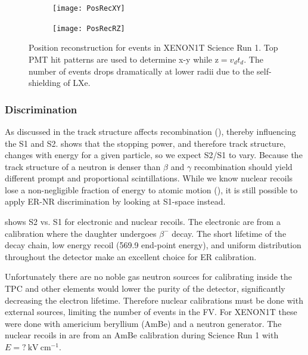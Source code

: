 \begin{figure}
    \centering
    \begin{subfigure}[t]{0.45\textwidth}
        \centering
        \texttt{[image: PosRecXY]}
    \end{subfigure}%
    \begin{subfigure}[t]{0.45\textwidth}
        \centering
        \texttt{[image: PosRecRZ]}
    \end{subfigure}
    \caption{Position reconstruction for events in XENON1T Science Run 1.  Top PMT hit patterns are used to determine x-y while
    $\mathrm{z} = v_{d} t_{d}$.  The number of events drops dramatically at lower radii due to the self-shielding of LXe.}
	\label{fig:tpcs_signals_posrec}
\end{figure}



\subsubsection{Discrimination}
\label{subsubsec:tpcs_signals_discr}
As discussed in  the track structure affects recombination (), thereby
influencing the S1 and S2.   shows that the stopping power, and therefore track structure, changes
with energy for a given particle, so we expect S2/S1 to vary.  Because the track structure of a neutron is denser than $\beta$ and
$\gamma$ recombination should yield different prompt and proportional scintillations.  While we know nuclear recoils lose a
non-negligible fraction of energy to atomic motion
(), it is still possible to apply ER-NR discrimination by looking at S1-space instead.

 shows S2 vs. S1 for electronic and nuclear recoils.  The electronic are from a  calibration
where the  daughter undergoes $\beta^{-}$ decay.  The short lifetime of the  decay chain, low energy
recoil (569.9 end-point energy), and uniform distribution throughout the detector make  an excellent choice for
ER calibration.

Unfortunately there are no noble gas neutron sources
for calibrating inside the TPC and other elements would lower the purity of the detector, significantly decreasing the electron
lifetime.  Therefore nuclear calibrations must be done with external sources, limiting the number of events in the FV.  For XENON1T
these were done with americium beryllium (AmBe) and a neutron generator.  The nuclear recoils in  are from
an AmBe calibration during Science Run 1 with $E = ?\ \mathrm{kV\ cm^{-1}}$.

